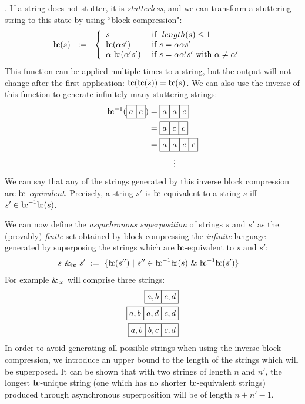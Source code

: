 \documentclass[a4paper,11pt]{article}
\newcommand{\bc}{{\rm b\!c}}
\newcommand{\vph}[1]{\vphantom{#1}}
\begin{document}
\fbox{$a\vph{'}$}\fbox{$c\vph{'}$}. If 
a string does not 
stutter, it is \textit{stutterless}, and we can transform a stuttering string 
to this 
state by using ``block compression":
\begin{align*}
\bc(s)  &\ \ :=\ \
\left\{ \begin{array}{ll}
s & \mbox{ if }~length(s)\leq 1 \\
\bc({\alpha}s')  & \mbox{ if } s={\alpha}{\alpha}s'\\
\alpha ~{\bc}({\alpha'}{s'})  
& \mbox{ if } s=\alpha{\alpha'}{s'} \mbox{ with } \alpha\neq\alpha'
\end{array}
\right. 
\end{align*}
This function can be applied multiple times to a string, but the output will 
not change after the first application: $\bc(\bc(s)) = \bc(s)$. We can also use 
the inverse of this function to generate infinitely many stuttering strings:
\begin{align*}
\bc^{-1}(\fbox{$a\vph{,'}$}\fbox{$c\vph{,'}$}) & = 
\fbox{$a\vph{,'}$}\fbox{$a\vph{,'}$}\fbox{$c\vph{,'}$} \\
& = \fbox{$a\vph{,'}$}\fbox{$c\vph{,'}$}\fbox{$c\vph{,'}$} \\
& = \fbox{$a\vph{,'}$}\fbox{$a\vph{,'}$}\fbox{$c\vph{,'}$}\fbox{$c\vph{,'}$} \\
& \hspace{3em} \vdots
\end{align*}
We can say that any of the strings generated by this inverse block compression 
are \textit{$\bc{}$-equivalent}. Precisely, a string $s'$ is $\bc{}$-equivalent 
to a 
string 
$s$ iff $s' \in \bc^{-1}\bc(s)$.

We can now define the \textit{asynchronous superposition} of strings $s$ and 
$s'$ as the (provably) \textit{finite} set obtained by block compressing the 
\textit{infinite} 
language generated by superposing the strings which are $\bc$-equivalent to $s$ 
and $s'$:
\begin{align*}
s\ \&_{\bc} \ s' & \ := \
\{\bc(s'') \ | \ s''\in \bc^{-1}\bc(s)\ \& \ \bc^{-1}\bc(s')\}
\end{align*}
For example \fbox{$a\vph{,'}$}\fbox{$c\vph{,'}$} $\&_{\bc}$ 
\fbox{$b\vph{,'}$}\fbox{$d\vph{,'}$} will comprise 
three strings:
\begin{align*}
\fbox{$a, b\vph{,'}$}\fbox{$c, d\vph{,'}$}\\
\fbox{$a, b\vph{,'}$}\fbox{$a, d\vph{,'}$}\fbox{$c, d\vph{,'}$}\\
\fbox{$a, b\vph{,'}$}\fbox{$b, c\vph{,'}$}\fbox{$c, d\vph{,'}$}\\
\end{align*}
In order to avoid generating all possible strings when using the inverse block 
compression, we introduce an upper bound to the length of the strings which 
will be superposed. It can be shown that with two strings of length $n$ and 
$n'$, the longest $\bc$-unique string (one which has no shorter 
$\bc$-equivalent strings) produced through asynchronous superposition will be 
of length $n+n'-1$.
\end{document}
